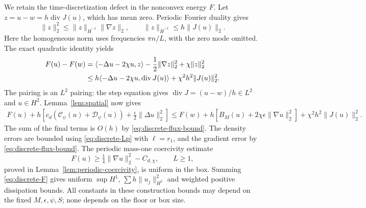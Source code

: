 \documentclass[11pt]{article}
\numberwithin{equation}{section}
\theoremstyle{definition}
\theoremstyle{remark}
\newcommand{\Div}{\operatorname{div}}
\newcommand{\norm}[1]{\lVert #1\rVert}
\newcommand{\Cpsi}{\mathcal C_\psi}
\newcommand{\Dpsi}{\mathcal D_\psi}
\begin{document}
We retain the time-discretization defect in the nonconvex energy $F$.
Let $z=u-w=h\Div J(u)$, which has mean zero. Periodic Fourier duality gives
\[
 \norm z_2^2\le\norm z_{\dot H^{-1}}\norm{\nabla z}_2,
 \qquad \norm z_{\dot H^{-1}}\le h\norm{J(u)}_2.
\]
Here the homogeneous norm uses frequencies $\pi n/L$, with the zero mode
omitted. The exact quadratic identity yields
\begin{align}\label{eq:quadratic-defect}
 F(u)-F(w)
 &=\langle-\Delta u-2\chi u,z\rangle
            -\frac12\norm{\nabla z}_2^2+\chi\norm z_2^2\notag\\
 &\le h\langle-\Delta u-2\chi u,\Div J(u)\rangle
                              +\chi^2h^2\norm{J(u)}_2^2.
\end{align}
The pairing is an $L^2$ pairing: the step equation gives
$\Div J=(u-w)/h\in L^2$ and $u\in H^2$.
Lemma~\ref{lem:spatial} now gives
\begin{align}\label{eq:discrete-F}
 F(u)+h\left[c_d(\Cpsi(u)+\Dpsi(u))
                      +\frac\epsilon2\norm{\Delta u}_2^2\right]
 \le F(w)+h[B_M(u)+2\chi\epsilon\norm{\nabla u}_2^2]
                        +\chi^2h^2\norm{J(u)}_2^2.
\end{align}
The sum of the final terms is $O(h)$ by
\eqref{eq:discrete-flux-bound}. The density errors are bounded using
\eqref{eq:discrete-Lp} with $\ell=r_1$, and the gradient error by
\eqref{eq:discrete-flux-bound}. The periodic mass-one coercivity estimate
\begin{equation}\label{eq:periodic-coercivity}
 F(u)\ge\tfrac14\norm{\nabla u}_2^2-C_{d,\chi},\qquad L\ge1,
\end{equation}
proved in Lemma~\ref{lem:periodic-coercivity}, is uniform in the box.
Summing \eqref{eq:discrete-F} gives uniform $\sup H^1$,
$\sum h\norm{u_j}_{H^2}^2$ and weighted positive dissipation bounds.
All constants in these construction bounds may depend on the fixed
$M,\epsilon,\psi,S$; none depends on the floor or box size.
\end{document}
